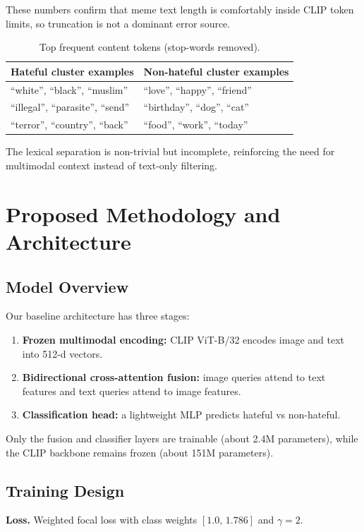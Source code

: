 \documentclass[11pt]{article}
\begin{document}
These numbers confirm that meme text length is comfortably inside CLIP token limits, so truncation is not a dominant error source.

\begin{table}[h]
\centering
\small
\caption{Top frequent content tokens (stop-words removed).}
\begin{tabular}{ll}
\toprule
Hateful cluster examples & Non-hateful cluster examples \\
\midrule
``white'', ``black'', ``muslim'' & ``love'', ``happy'', ``friend'' \\
``illegal'', ``parasite'', ``send'' & ``birthday'', ``dog'', ``cat'' \\
``terror'', ``country'', ``back'' & ``food'', ``work'', ``today'' \\
\bottomrule
\end{tabular}
\label{tab:topwordsmid}
\end{table}

The lexical separation is non-trivial but incomplete, reinforcing the need for multimodal context instead of text-only filtering.

\section{Proposed Methodology and Architecture}
\subsection{Model Overview}
Our baseline architecture has three stages:
\begin{enumerate}[leftmargin=*]
  \item \textbf{Frozen multimodal encoding:} CLIP ViT-B/32 encodes image and text into 512-d vectors.
  \item \textbf{Bidirectional cross-attention fusion:} image queries attend to text features and text queries attend to image features.
  \item \textbf{Classification head:} a lightweight MLP predicts hateful vs non-hateful.
\end{enumerate}

Only the fusion and classifier layers are trainable (about 2.4M parameters), while the CLIP backbone remains frozen (about 151M parameters).

\subsection{Training Design}
\textbf{Loss.} Weighted focal loss with class weights \([1.0,\,1.786]\) and \(\gamma=2\).
\end{document}

